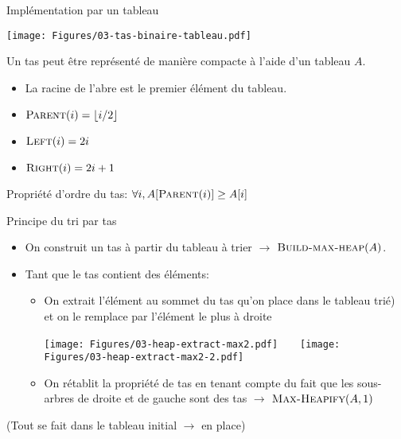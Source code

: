 

\begin{frame}{Implémentation par un tableau}

\centerline{\texttt{[image: Figures/03-tas-binaire-tableau.pdf]}}

\bigskip

Un tas peut être représenté de manière compacte à l'aide d'un tableau $A$.

\begin{itemize}
\item La racine de l'abre est le premier élément du tableau.
\item $\textnormal{\scshape Parent}(i)=\lfloor i/2\rfloor$
\item $\textnormal{\scshape Left}(i)=2i$
\item $\textnormal{\scshape Right}(i)=2i+1$
\end{itemize}

Propriété d'ordre du tas: $\forall i, A[\textnormal{\scshape Parent}(i)]\geq A[i]$

\end{frame}

\begin{frame}{Principe du tri par tas}
\begin{itemize}
\item On construit un tas à partir du tableau à trier $\rightarrow$ $\textnormal{\scshape Build-max-heap}(A)$.
\item Tant que le tas contient des éléments:
\begin{itemize}
\item On extrait l'élément au sommet du tas qu'on place dans le
  tableau trié) et on le remplace par l'élément le plus à droite

\centerline{\texttt{[image: Figures/03-heap-extract-max2.pdf]}~~~~\texttt{[image: Figures/03-heap-extract-max2-2.pdf]}}

\item On rétablit la propriété de tas en tenant compte du fait que les sous-arbres de droite et de gauche sont des tas $\rightarrow$ $\textnormal{\scshape Max-Heapify}(A,1)$ 
\end{itemize}
\end{itemize}
(Tout se fait dans le tableau initial $\rightarrow$ en place)
\end{frame}


